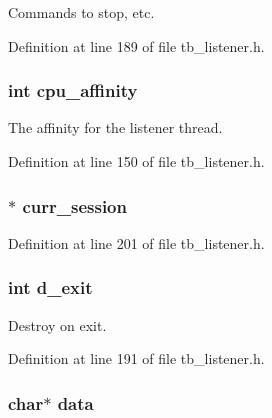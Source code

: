 Commands to stop, etc. 



Definition at line 189 of file tb\-\_\-listener.\-h.

\hypertarget{structtb__listener__t_ab7a892d2900125821f3d6b11d003191b}{
\subsubsection[{cpu\-\_\-affinity}]{\setlength{\rightskip}{0pt plus 5cm}int cpu\-\_\-affinity}}\label{structtb__listener__t_ab7a892d2900125821f3d6b11d003191b}


The affinity for the listener thread. 



Definition at line 150 of file tb\-\_\-listener.\-h.

\hypertarget{structtb__listener__t_a77b5086c18c650adfe86a3489057d9f9}{
\subsubsection[{curr\-\_\-session}]{$\ast$ curr\-\_\-session}}\label{structtb__listener__t_a77b5086c18c650adfe86a3489057d9f9}


Definition at line 201 of file tb\-\_\-listener.\-h.

\hypertarget{structtb__listener__t_a73b88865af668ff87dacd74c1f838da6}{
\subsubsection[{d\-\_\-exit}]{\setlength{\rightskip}{0pt plus 5cm}int d\-\_\-exit}}\label{structtb__listener__t_a73b88865af668ff87dacd74c1f838da6}


Destroy on exit. 



Definition at line 191 of file tb\-\_\-listener.\-h.

\hypertarget{structtb__listener__t_a91a70b77df95bd8b0830b49a094c2acb}{
\subsubsection[{data}]{\setlength{\rightskip}{0pt plus 5cm}char$\ast$ data}}\label{structtb__listener__t_a91a70b77df95bd8b0830b49a094c2acb}


